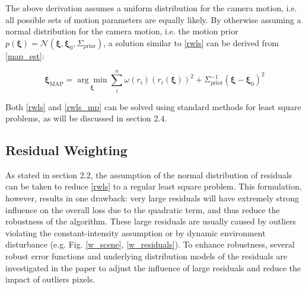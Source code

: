 \documentclass[acmsmall, nonacm, 11pt]{acmart}
\begin{document}
The above derivation assumes a uniform distribution for the camera motion, i.e. all possible sets of motion parameters are equally likely. By otherwise assuming a normal distribution for the camera motion, i.e. the motion prior $p(\boldsymbol{\xi})=\mathcal{N}\left(\boldsymbol{\xi}, \boldsymbol{\xi}_{0}, \Sigma_{\text {prior}}\right)$, a solution similar to \eqref{rwls} can be derived from \eqref{map_est}:

\begin{equation}
\boldsymbol{\xi}_{\mathrm{MAP}}=\underset{\boldsymbol{\xi}}{\arg \min } \sum_{i}^{n}\omega(r_i)(r_{i}(\boldsymbol{\xi}))^{2}+\Sigma_{\text{prior}}^{-1}\left(\boldsymbol{\xi}-\boldsymbol{\xi}_{0}\right)^{2}
\label{rwls_mp}
\end{equation}

Both \eqref{rwls} and \eqref{rwls_mp} can be solved using standard methods for least square problems, as will be discussed in section 2.4.

\subsection{Residual Weighting}

As stated in section 2.2, the assumption of the normal distribution of residuals can be taken to reduce \eqref{rwls} to a regular least square problem. This formulation, however, results in one drawback: very large residuals will have extremely strong influence on the overall loss due to the quadratic term, and thus reduce the robustness of the algorithm. These large residuals are usually caused by outliers violating the constant-intensity assumption or by dynamic environment disturbance (e.g. Fig. \ref{w_scene}, \ref{w_residuals}). To enhance robustness, several robust error functions and underlying distribution models of the residuals are investigated in the paper to adjust the influence of large residuals and reduce the impact of outliers pixels.
\end{document}
